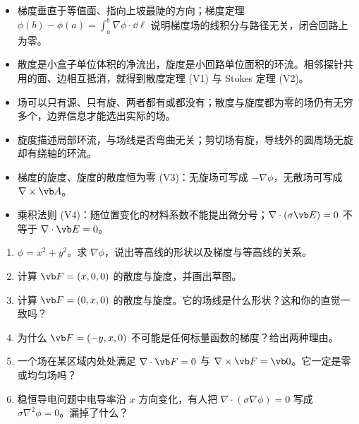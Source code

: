 \begin{takeaways}
\begin{itemize}
\item 梯度垂直于等值面、指向上坡最陡的方向；梯度定理 $\phi(b)-\phi(a)=\int_a^b\nabla\phi\cdot\dd\boldsymbol\ell$ 说明梯度场的线积分与路径无关，闭合回路上为零。
\item 散度是小盒子单位体积的净流出，旋度是小回路单位面积的环流。相邻探针共用的面、边相互抵消，就得到散度定理 (V1) 与 Stokes 定理 (V2)。
\item 场可以只有源、只有旋、两者都有或都没有；散度与旋度都为零的场仍有无穷多个，边界信息才能选出实际的场。
\item 旋度描述局部环流，与场线是否弯曲无关；剪切场有旋，导线外的圆周场无旋却有绕轴的环流。
\item 梯度的旋度、旋度的散度恒为零 (V3)：无旋场可写成 $-\nabla\phi$，无散场可写成 $\nabla\times\vb A$。
\item 乘积法则 (V4)：随位置变化的材料系数不能提出微分号；$\nabla\cdot(\sigma\vb E)=0$ 不等于 $\nabla\cdot\vb E=0$。
\end{itemize}
\end{takeaways}

\begin{selfcheck}
\begin{enumerate}
\item $\phi=x^2+y^2$。求 $\nabla\phi$，说出等高线的形状以及梯度与等高线的关系。
\item 计算 $\vb F=(x,0,0)$ 的散度与旋度，并画出草图。
\item 计算 $\vb F=(0,x,0)$ 的散度与旋度。它的场线是什么形状？这和你的直觉一致吗？
\item 为什么 $\vb F=(-y,x,0)$ 不可能是任何标量函数的梯度？给出两种理由。
\item 一个场在某区域内处处满足 $\nabla\cdot\vb F=0$ 与 $\nabla\times\vb F=\vb 0$。它一定是零或均匀场吗？
\item 稳恒导电问题中电导率沿 $x$ 方向变化，有人把 $\nabla\cdot(\sigma\nabla\phi)=0$ 写成 $\sigma\nabla^2\phi=0$。漏掉了什么？
\end{enumerate}
\end{selfcheck}

